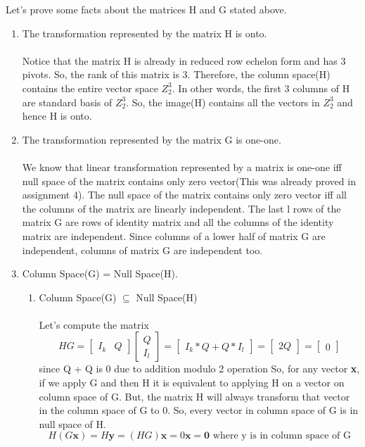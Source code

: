 \documentclass[11pt,a4paper]{article}
\begin{document}
Let's prove some facts about the matrices H and G stated above.
\begin{enumerate}
    \item The transformation represented by the matrix H is onto.\\~\\
    Notice that the matrix H is already in reduced row echelon form and has 3 pivots. So, the rank of this matrix is 3. Therefore, the column space(H) contains the entire vector space $Z_2^3$. In other words, the first 3 columns of H are standard basis of $Z_2^3$. So, the image(H) contains all the vectors in $Z_2^3$ and hence H is onto.
    
    \item The transformation represented by the matrix G is one-one.\\~\\
    We know that linear transformation represented by a matrix is one-one iff null space of the matrix contains only zero vector(This was already proved in assignment 4). The null space of the matrix contains only zero vector iff all the columns of the matrix are linearly independent. The last l rows of the matrix G are rows of identity matrix and all the columns of the identity matrix are independent. Since columns of a lower half of matrix G are independent, columns of matrix G are independent too.
    
    \item Column Space(G) = Null Space(H).
    
    \begin{enumerate}
        \item Column Space(G) $\subseteq$ Null Space(H)\\~\\
        Let's compute the matrix
        $$
        HG = 
        \begin{bmatrix}
            I_k & Q
        \end{bmatrix}
        \begin{bmatrix}
            Q \\
            I_l
        \end{bmatrix}
        = 
        \begin{bmatrix}
            I_k*Q + Q*I_l    
        \end{bmatrix}
        =
        \begin{bmatrix}
            2Q
        \end{bmatrix}
        =
        \begin{bmatrix}
            0
        \end{bmatrix}
        $$
        since Q + Q is 0 due to addition modulo 2 operation
        So, for any vector \textbf{x}, if we apply G and then H it is equivalent to applying H on a vector on column space of G. But, the matrix H will always transform that vector in the column space of G to 0. So, every vector in column space of G is in null space of H. 
        $$
        H(G\mathbf{x}) = H\mathbf{y} = (HG)\mathbf{x} = 0\mathbf{x} = \mathbf{0} \text{ where y is in column space of G}
        $$
        

\end{enumerate}
\end{enumerate}
\end{document}
